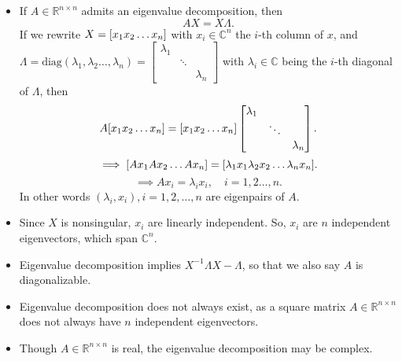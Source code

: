 \documentclass[12pt]{article}
\theoremstyle{definition}
\theoremstyle{remark}
\newcommand{\R}{\mathbb{R}}
\newcommand{\C}{\mathbb{C}}
\begin{document}
\begin{itemize}
		\item If $A\in \R^{n\times n}$ admits an eigenvalue decomposition, then \[
		AX=X\Lambda
	.\] If we rewrite $X=[x_1\space x_2\space \ldots\space x_n]$ with $x_{i}\in \C^{n}$ the $i$-th column of $x$, and $\Lambda=\text{diag}(\lambda_1,\lambda_2\ldots,\lambda_n)=\begin{bmatrix} \lambda_1&&\\&\ddots&\\&&\lambda_n \end{bmatrix} $ with $\lambda_{i}\in \C$ being the $i$-th diagonal of $\Lambda$, then \[
	A[x_1\space x_2\space \ldots\space x_n]=[x_1\space x_2\space \ldots\space x_n]\begin{bmatrix} \lambda_1&&\\&\ddots&\\&&\lambda_n \end{bmatrix}
	.\] \[
		\implies [Ax_1\space Ax_2\space \ldots\space Ax_n]=[\lambda_1 x_1\space \lambda_2 x_2\space \ldots\space \lambda_n x_n]
	.\] \[
		\implies Ax_{i}=\lambda_ix_{i},\quad i=1,2\ldots,n
	.\] 
	In other words $\left( \lambda_i,x_{i} \right) ,i=1,2,\ldots,n$ are eigenpairs of $A$.
\item Since $X$ is nonsingular, $x_{i}$ are linearly independent. So, $x_{i}$ are $n$ independent eigenvectors, which span $\C^{n}$.
\item Eigenvalue decomposition implies $X^{-1}\Lambda X - \Lambda$, so that we also say $A$ is diagonalizable.
\item Eigenvalue decomposition does not always exist, as a square matrix $A\in \R^{n\times n}$ does not always have $n$ independent eigenvectors.
\item Though $A\in \R^{n\times n}$ is real, the eigenvalue decomposition may be complex.
\end{itemize}
\end{document}
